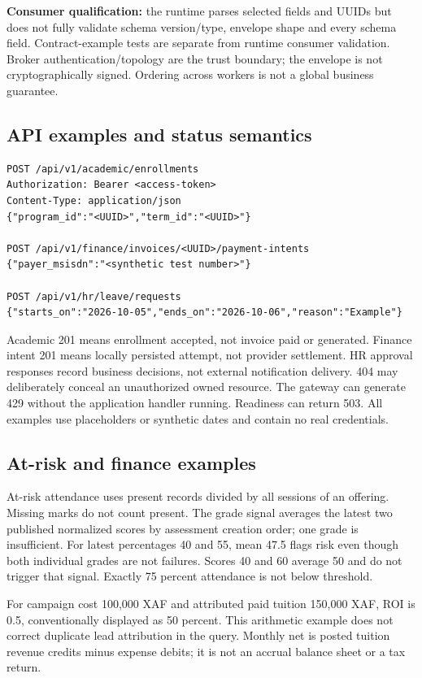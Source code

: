 \documentclass[10pt,a4paper]{article}
\begin{document}
\textbf{Consumer qualification:} the runtime parses selected fields and UUIDs but
does not fully validate schema version/type, envelope shape and every schema field.
Contract-example tests are separate from runtime consumer validation. Broker
authentication/topology are the trust boundary; the envelope is not cryptographically
signed. Ordering across workers is not a global business guarantee.

\subsection{API examples and status semantics}
\begin{lstlisting}
POST /api/v1/academic/enrollments
Authorization: Bearer <access-token>
Content-Type: application/json
{"program_id":"<UUID>","term_id":"<UUID>"}

POST /api/v1/finance/invoices/<UUID>/payment-intents
{"payer_msisdn":"<synthetic test number>"}

POST /api/v1/hr/leave/requests
{"starts_on":"2026-10-05","ends_on":"2026-10-06","reason":"Example"}
\end{lstlisting}
Academic 201 means enrollment accepted, not invoice paid or generated.
Finance intent 201 means locally persisted attempt, not provider settlement.
HR approval responses record business decisions, not external notification delivery.
404 may deliberately conceal an unauthorized owned resource. The gateway can
generate 429 without the application handler running. Readiness can return 503.
All examples use placeholders or synthetic dates and contain no real credentials.

\subsection{At-risk and finance examples}
At-risk attendance uses present records divided by all sessions of an offering.
Missing marks do not count present. The grade signal averages the latest two
published normalized scores by assessment creation order; one grade is insufficient.
For latest percentages 40 and 55, mean 47.5 flags risk even though both individual
grades are not failures. Scores 40 and 60 average 50 and do not trigger that signal.
Exactly 75 percent attendance is not below threshold.

For campaign cost 100,000 XAF and attributed paid tuition 150,000 XAF,
ROI is 0.5, conventionally displayed as 50 percent. This arithmetic example does
not correct duplicate lead attribution in the query. Monthly net is posted tuition
revenue credits minus expense debits; it is not an accrual balance sheet or a tax return.
\end{document}
